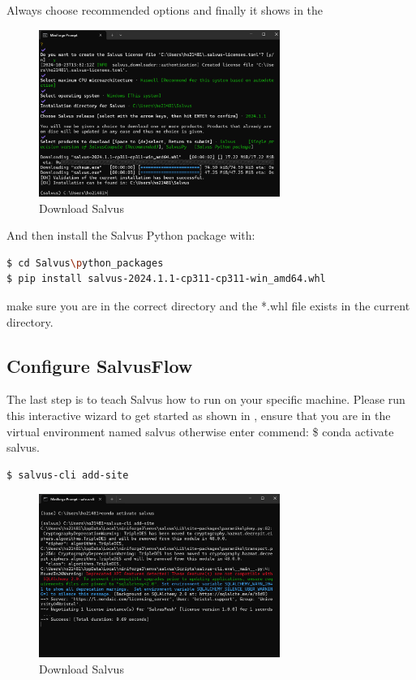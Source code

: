\documentclass[a4paper, 12pt]{article}
\theoremstyle{plain}
\begin{document}
\noindent
Always choose recommended options and finally it shows in the 

\begin{figure}[H]
  \centering
  \includegraphics[width=0.7\textwidth]{final}
  \caption{Download Salvus}
  \label{fig:final}
\end{figure}

\noindent
And then install the Salvus Python package with: \\

\begin{lstlisting}[language=bash]
$ cd Salvus\python_packages
$ pip install salvus-2024.1.1-cp311-cp311-win_amd64.whl 
\end{lstlisting}
\vspace{1cm}

make sure you are in the correct directory and the *.whl file exists in the current directory.

\subsection*{Configure SalvusFlow}
The last step is to teach Salvus how to run on your specific machine. Please run this interactive wizard to get started as shown in , ensure that you are in the virtual environment named salvus otherwise enter commend: \$ conda activate salvus.\\

\begin{lstlisting}[language=bash]
$ salvus-cli add-site
\end{lstlisting}
\vspace{1cm}

\begin{figure}[H]
  \centering
  \includegraphics[width=0.7\textwidth]{config}
  \caption{Download Salvus}
  \label{fig:config}
\end{figure}
\end{document}
